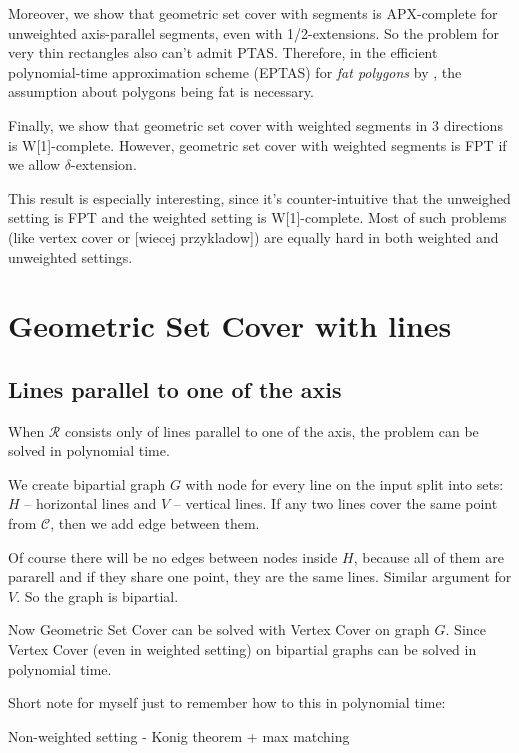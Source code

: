 \documentclass[en]{pracamgr}
\theoremstyle{plain}
\theoremstyle{definition}
\begin{document}
Moreover, we show that geometric set cover with segments
is APX-complete for unweighted axis-parallel segments,
even with 1/2-extensions.
So the problem for very thin rectangles
also can't admit PTAS.
Therefore, in the efficient polynomial-time approximation scheme (EPTAS)
for \textit{fat polygons} by \cite{harpeled12},
the assumption about polygons being fat is necessary. 

Finally, we show that geometric set cover with weighted segments in
3 directions is W[1]-complete.
However, geometric set cover with weighted segments is FPT if we allow
$\delta$-extension.

This result is especially interesting,
since it's counter-intuitive that
the unweighed setting is FPT and the weighted
setting is W[1]-complete.
Most of such problems (like vertex cover or [wiecej przykladow])
are equally hard in both weighted and unweighted settings.







\chapter{Geometric Set Cover with lines}
\section{Lines parallel to one of the axis}
When $\mathcal{R}$ consists only of lines parallel to
one of the axis, the problem can be solved in
polynomial time.

We create bipartial graph $G$ with node for every line on the input
split into sets: $H$ -- horizontal lines and $V$ -- vertical lines.
If any two lines cover the same point from $\mathcal{C}$, then
we add edge between them.

Of course there will be no edges between nodes inside $H$,
because all of them are pararell and if they share 
one point, they are the same lines. Similar argument for $V$.
So the graph is bipartial.

Now Geometric Set Cover can be solved with Vertex Cover on graph $G$.
Since Vertex Cover (even in weighted setting) 
on bipartial graphs can be solved in polynomial time.

Short note for myself just to remember how to this in polynomial time:

Non-weighted setting - Konig theorem + max matching
\end{document}
